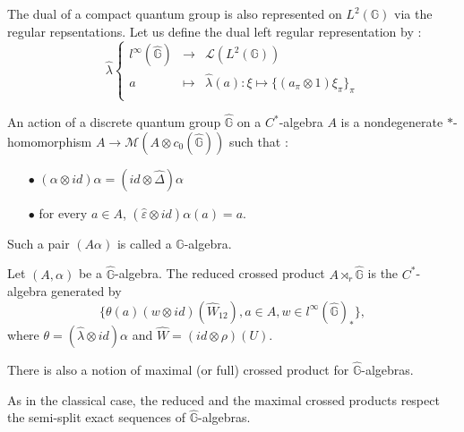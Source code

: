 The dual of a compact quantum group is also represented on $L^2(\mathbb G)$ via the regular repsentations. Let us define the dual left regular representation by :
\[\hat\lambda\left\{\begin{array}{rcl}
l^\infty(\hat{\mathbb G}) & \rightarrow & \mathcal L(L^2(\mathbb G)) \\
a	& \mapsto & \hat\lambda (a) : \xi \mapsto \{(a_\pi\otimes 1)\xi_\pi\}_\pi\\
\end{array}\right.\]


\begin{definition} An action of a discrete quantum group $\hat{\mathbb G}$ on a $C^*$-algebra $A$ is a nondegenerate $*$-homomorphism $A\rightarrow \mathcal M(A\otimes c_0(\hat{\mathbb G}))$ such that :
\begin{itemize}
\item[$\bullet$] $(\alpha \otimes id )\alpha = (id\otimes \hat\Delta) \alpha$
\item[$\bullet$] for every $a\in A$, $(\hat\varepsilon \otimes id)\alpha(a) = a$.
\end{itemize}
Such a pair $(A\alpha)$ is called a $\hat{\mathbb G}$-algebra.
\end{definition}

\begin{definition} Let $(A,\alpha)$ be a $\hat{\mathbb G}$-algebra. The reduced crossed product $A\rtimes_r \hat{\mathbb G}$ is the $C^*$-algebra generated by 
\[\{\theta(a)(w\otimes id)(\hat W_{12}), a\in A , w\in l^\infty(\hat{\mathbb G})_* \},\]
where $\theta = (\hat\lambda \otimes id)\alpha$ and $\hat W = (id\otimes \rho)(U)$.  
\end{definition}

\begin{rk}
There is also a notion of maximal (or full) crossed product for $\hat{\mathbb G}$-algebras.
\end{rk}

\begin{rk}
As in the classical case, the reduced and the maximal crossed products respect the semi-split exact sequences of $\hat{\mathbb G}$-algebras.
\end{rk}

































